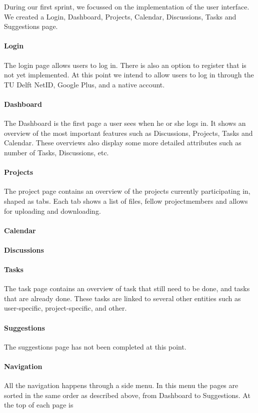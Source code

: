 During our first sprint, we focussed on the implementation of the user interface. We created a Login, Dashboard, Projects, Calendar, Discussions, Tasks and Suggestions page.

\paragraph{Login}

The login page allows users to log in. There is also an option to register that is not yet implemented. At this point we intend to allow users to log in through the TU Delft NetID, Google Plus, and a native account.

\paragraph{Dashboard}

The Dashboard is the first page a user sees when he or she logs in. It shows an overview of the most important features such as Discussions, Projects, Tasks and Calendar. These overviews also display some more detailed attributes such as number of Tasks, Discussions, etc.

\paragraph{Projects}

The project page contains an overview of the projects currently participating in, shaped as tabs. Each tab shows a list of files, fellow projectmembers and allows for uploading and downloading.

\paragraph{Calendar}

\paragraph{Discussions}

\paragraph{Tasks}

The task page contains an overview of task that still need to be done, and tasks that are already done. These tasks are linked to several other entities such as user-specific, project-specific, and other.

\paragraph{Suggestions}

The suggestions page has not been completed at this point.

\paragraph{Navigation}

All the navigation happens through a side menu. In this menu the pages are sorted in the same order as described above, from Dashboard to Suggestions. At the top of each page is